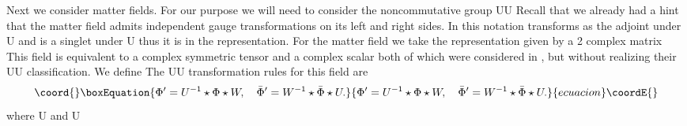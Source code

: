 \documentclass[a4paper,12pt]{article}
\begin{document}
Next we consider matter fields. For our purpose we will need to consider the
noncommutative group U\coordHE{}U\coordHE{} Recall that we already had a hint that the matter
field admits independent gauge transformations on its left and right sides.
In this notation \coordHE{} transforms as the adjoint under U\coordHE{} and is a singlet under U\coordHE{} thus it is in the \coordHE{} representation. For the
matter field we take the \coordHE{}
representation given by a 2\coordHE{} complex matrix \coordHE{} This field is equivalent to a complex
symmetric tensor \coordHE{} and a complex scalar \myHighlight{$\varphi ,$}\coordHE{} both of which
were considered in \cite{NCSp}, but without realizing their U\coordHE{}U\coordHE{}
classification. We define \coordHE{} The U\coordHE{}U\coordHE{} transformation rules for this field are 
\begin{equation}\coord{}\boxEquation{
\Phi ^{\prime }=U^{-1}\star \Phi \star W,\quad \bar{\Phi}^{\prime
}=W^{-1}\star \bar{\Phi}\star U.
}{
\Phi ^{\prime }=U^{-1}\star \Phi \star W,\quad \bar{\Phi}^{\prime
}=W^{-1}\star \bar{\Phi}\star U.
}{ecuacion}\coordE{}\end{equation}
where \coordHE{}U\coordHE{} and \coordHE{}U\coordHE{}
\end{document}
